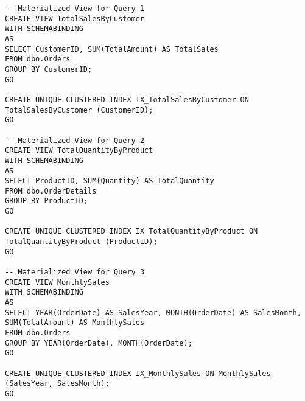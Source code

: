 
         \begin{lstlisting}
-- Materialized View for Query 1
CREATE VIEW TotalSalesByCustomer
WITH SCHEMABINDING
AS
SELECT CustomerID, SUM(TotalAmount) AS TotalSales
FROM dbo.Orders
GROUP BY CustomerID;
GO

CREATE UNIQUE CLUSTERED INDEX IX_TotalSalesByCustomer ON TotalSalesByCustomer (CustomerID);
GO

-- Materialized View for Query 2
CREATE VIEW TotalQuantityByProduct
WITH SCHEMABINDING
AS
SELECT ProductID, SUM(Quantity) AS TotalQuantity
FROM dbo.OrderDetails
GROUP BY ProductID;
GO

CREATE UNIQUE CLUSTERED INDEX IX_TotalQuantityByProduct ON TotalQuantityByProduct (ProductID);
GO

-- Materialized View for Query 3
CREATE VIEW MonthlySales
WITH SCHEMABINDING
AS
SELECT YEAR(OrderDate) AS SalesYear, MONTH(OrderDate) AS SalesMonth, SUM(TotalAmount) AS MonthlySales
FROM dbo.Orders
GROUP BY YEAR(OrderDate), MONTH(OrderDate);
GO

CREATE UNIQUE CLUSTERED INDEX IX_MonthlySales ON MonthlySales (SalesYear, SalesMonth);
GO

        \end{lstlisting}